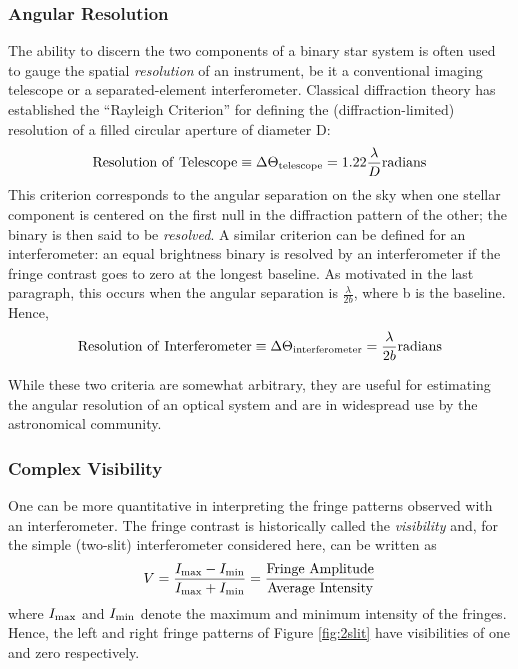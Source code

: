 \documentclass[12pt]{iopart}
\def\text{\rm}
\begin{document}
\subsubsection{Angular Resolution}
The ability to discern the two components of a binary star
system is often used to gauge the spatial {\em resolution} of an
instrument, be it a conventional imaging telescope or a
separated-element interferometer.  Classical diffraction theory has
established the ``Rayleigh Criterion'' for defining the
(diffraction-limited) resolution of a filled circular aperture of
diameter D:
\begin{equation}
 {\text{Resolution~of~Telescope}}  \equiv  \Delta\Theta_{\text{telescope}} 
 =  1.22 \frac{\lambda}{D} 
{\text{ radians}} 
\end{equation}
This criterion corresponds to the angular separation on the sky when
one stellar component is centered on the first null in the diffraction
pattern of the other; the binary is then said to be {\em resolved}.  A
similar criterion can be defined for an interferometer: an
equal brightness binary is resolved by an interferometer 
if the fringe contrast goes to zero at the longest baseline.
As motivated in the last paragraph,
this occurs when the angular separation is $\frac{\lambda}{2b}$, where
b is the baseline.  Hence,
\begin{equation}
 {\text{Resolution~of~Interferometer}}  \equiv  \Delta\Theta_{\text{interferometer}} 
 =  \frac{\lambda}{2b} 
{\text{ radians}} 
\end{equation}

While these two criteria are somewhat arbitrary, they are useful for
estimating the angular resolution of an optical system and are in
widespread use by the astronomical community.


\subsubsection{Complex Visibility}
\label{section:zernike1}
One can be more quantitative in interpreting the fringe
patterns observed with an interferometer.
The fringe contrast is historically called the
{\em visibility} and, for the simple (two-slit) interferometer considered here,
can be written as  
\begin{equation}
V = \frac{I_{\text{max}} - I_{\text{min}}}
{I_{\text{max}} + I_{\text{min}}}
  =  \frac{{\rm Fringe~Amplitude}}{{\rm Average~ Intensity}}
\end{equation}
where $I_{\text{max}}$ and $I_{\text{min}}$ denote the maximum and
minimum intensity of the fringes.  Hence, the left and right fringe
patterns of Figure \ref{fig:2slit} have visibilities of one and zero
respectively. 
\end{document}
